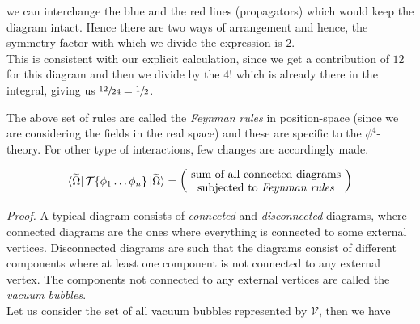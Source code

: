 \begin{itemize}[label=$\blacktriangleright$]
\begin{center}
    \end{center}
    we can interchange the blue and the red lines (propagators) which would keep the diagram intact. Hence there are two ways of arrangement and hence, the symmetry factor with which we divide the expression is $2$.\\[0.2cm] This is consistent with our explicit calculation, since we get a contribution of $12$ for this diagram and then we divide by the $4!$ which is already there in the integral, giving us $\sfrac{12}{24}=\sfrac{1}{2}$.
\end{itemize}
The above set of rules are called the \textit{Feynman rules} in position-space (since we are considering the fields in the real space) and these are specific to the $\phi^4$-theory. For other type of interactions, few changes are accordingly made. 
\begin{theorem}
  $$\vactb \ST\{\phi_1 \ldots \phi_n\} \vact = \mqty(\text{~sum of all connected diagrams~}\\ \text{subjected to \textit{Feynman rules}})$$
\end{theorem}
\textit{Proof.} A typical diagram consists of \textit{connected} and \textit{disconnected} diagrams, where connected diagrams are the ones where everything is connected to some external vertices. Disconnected diagrams are such that the diagrams consist of different components where at least one component is not connected to any external vertex. The components not connected to any external vertices are called the \textit{vacuum bubbles}. \\[0.2cm]
Let us consider the set of all vacuum bubbles represented by $\mathcal{V}$, then we have 
